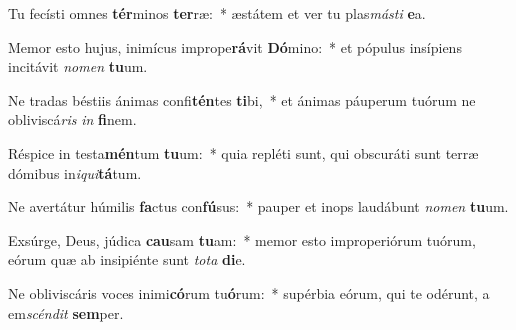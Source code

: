 \item Tu fecísti omnes \textbf{tér}minos \textbf{ter}ræ:~* æstátem et ver tu plas\textit{másti} \textbf{e}a.
\item Memor esto hujus, inimícus imprope\textbf{rá}vit \textbf{Dó}mino:~* et pópulus insípiens incitávit \textit{nomen} \textbf{tu}um.
\item Ne tradas béstiis ánimas confi\textbf{tén}tes \textbf{ti}bi,~* et ánimas páuperum tuórum ne obliviscá\textit{ris} \textit{in} \textbf{fi}nem.
\item Réspice in testa\textbf{mén}tum \textbf{tu}um:~* quia repléti sunt, qui obscuráti sunt terræ dómibus in\textit{iqui}\textbf{tá}tum.
\item Ne avertátur húmilis \textbf{fa}ctus con\textbf{fú}sus:~* pauper et inops laudábunt \textit{nomen} \textbf{tu}um.
\item Exsúrge, Deus, júdica \textbf{cau}sam \textbf{tu}am:~* memor esto improperiórum tuórum, eórum quæ ab insipiénte sunt \textit{tota} \textbf{di}e.
\item Ne obliviscáris voces inimi\textbf{có}rum tu\textbf{ó}rum:~* supérbia eórum, qui te odérunt, a em\textit{scéndit} \textbf{sem}per.
